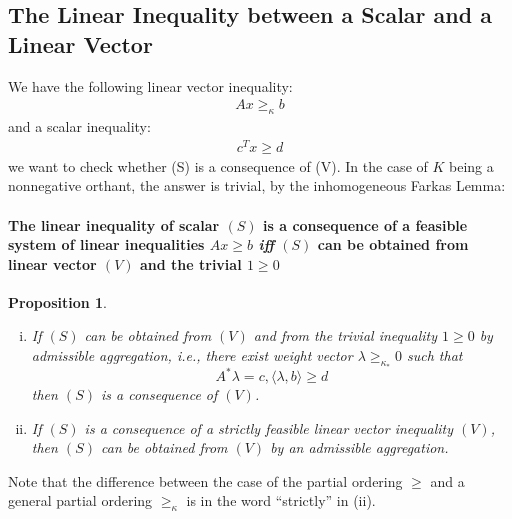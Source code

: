 \documentclass[12pt]{article}
\newtheorem*{proposition}{Proposition}
\begin{document}
   \subsection{The Linear Inequality between a Scalar and a Linear Vector}
   We have the following linear vector inequality:
   \begin{align*}
       Ax \geq_\kappa b
       \tag{V}
   \end{align*}
   and a scalar inequality:
   \begin{align*}
       c^Tx \geq d
       \tag{S}
   \end{align*}
   we want to check whether (S) is a consequence of (V). In the case of $K$ being a nonnegative orthant, the answer is trivial, by the inhomogeneous Farkas Lemma:
   \paragraph{The linear inequality of scalar $(S)$ is a consequence of a feasible system of linear inequalities $Ax \geq b$ \textit{iff} $(S)$ can be obtained from linear vector $(V)$ and the trivial $1 \geq 0$ \\}
   \begin{proposition}
   \begin{enumerate}[(i)]
   \item If $(S)$ can be obtained from $(V)$ and from the trivial inequality $1 \geq 0$ by
admissible aggregation, i.e., there exist weight vector  $\lambda \geq_{\kappa_*} 0$ such that
 $$A^* \lambda = c,\langle \lambda,b \rangle \geq d$$ then $(S)$ is a consequence of $(V)$.
 \item If $(S)$ is a consequence of a strictly feasible linear vector inequality $(V)$, then $(S)$ can be obtained from $(V)$ by an admissible aggregation.
   \end{enumerate}
   \end{proposition}
   Note that the difference between the case of the partial ordering $\geq$ and a general partial ordering $\geq_\kappa$ is in the word “strictly” in (ii).
\end{document}
